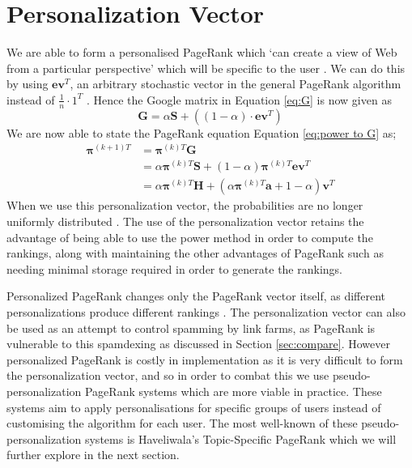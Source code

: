 \documentclass[11pt]{report}
\begin{document}
\section{Personalization Vector} \label{sec:Personalization}

We are able to form a personalised PageRank which `can create a view of Web from a particular perspective' which will be specific to the user \cite{page1999pagerank}. We can do this by using $\textbf{ev}^T$, an arbitrary stochastic vector in the general PageRank algorithm instead of $\frac{1}{n}\cdot1^T$ \cite{bonato}. Hence the Google matrix in Equation \eqref{eq:G} is now given as 
\begin{equation}\label{eq:Personalisation G}
\textbf{G}=\alpha\textbf{S}+\left((1-\alpha)\cdot\textbf{ev}^T\right)
\end{equation} 
We are now able to state the PageRank equation Equation \eqref{eq:power to G} as; 
\begin{align}
\boldsymbol{\pi}^{(k+1)T} &= \boldsymbol{\pi}^{(k)T}\textbf{G} \nonumber \\
&= \alpha\boldsymbol{\pi}^{(k)T}\textbf{S} + (1-\alpha)\boldsymbol{\pi}^{(k)T}\textbf{ev}^T \nonumber \\
&= \alpha\boldsymbol{\pi}^{(k)T}\textbf{H} + \left(\alpha\boldsymbol{\pi}^{(k)T}\textbf{a} + 1 - \alpha\right)\textbf{v}^T \label{eq:Power personalization}
\end{align}
When we use this personalization vector, the probabilities are no longer uniformly distributed \cite{langville}. The use of the personalization vector retains the advantage of being able to use the power method in order to compute the rankings, along with maintaining the other advantages of PageRank such as needing minimal storage required in order to generate the rankings.

Personalized PageRank changes only the PageRank vector itself, as different personalizations produce different rankings \cite{thorson2004modeling}. The personalization vector can also be used as an attempt to control spamming by link farms, as PageRank is vulnerable to this spamdexing as discussed in Section \ref{sec:compare}. However personalized PageRank is costly in implementation as it is very difficult to form the personalization vector, and so in order to combat this we use pseudo-personalization PageRank systems which are more viable in practice. These systems aim to apply personalisations for specific groups of users instead of customising the algorithm for each user. The most well-known of these pseudo-personalization systems is Haveliwala's Topic-Specific PageRank which we will further explore in the next section.
\end{document}
